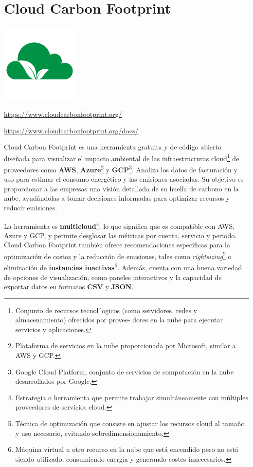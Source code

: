 \documentclass[12pt,a4paper]{report}
\begin{document}
\section*{Cloud Carbon Footprint}

\begin{center}
\includegraphics[width=0.3\textwidth]{imagenes/Cloud_Logo.png}
\end{center}

\href{https://www.cloudcarbonfootprint.org/}{https://www.cloudcarbonfootprint.org/}

\href{https://www.cloudcarbonfootprint.org/docs/}{https://www.cloudcarbonfootprint.org/docs/}

Cloud Carbon Footprint es una herramienta gratuita y de código abierto diseñada
para visualizar el impacto ambiental de las infraestructuras cloud\footnote{Conjunto de recursos tecnol´ogicos (como servidores, redes y almacenamiento) ofrecidos por provee-
  dores en la nube para ejecutar servicios y aplicaciones.} de
proveedores como \textbf{AWS}, \textbf{Azure}\footnote{Plataforma de
  servicios en la nube proporcionada por Microsoft, similar a AWS y GCP.} y
\textbf{GCP}\footnote{Google Cloud Platform, conjunto de servicios de
  computación en la nube desarrollados por Google.}. Analiza los datos de
facturación y uso para estimar el consumo energético y las emisiones asociadas.
Su objetivo es proporcionar a las empresas una visión detallada de su huella de
carbono en la nube, ayudándolas a tomar decisiones informadas para optimizar
recursos y reducir emisiones.

La herramienta es \textbf{multicloud}\footnote{Estrategia o herramienta que
  permite trabajar simultáneamente con múltiples proveedores de servicios
  cloud.}, lo que significa que es compatible con AWS, Azure y GCP, y permite
desglosar las métricas por cuenta, servicio y periodo. Cloud Carbon Footprint
también ofrece recomendaciones específicas para la optimización de costos y la
reducción de emisiones, tales como \textit{rightsizing}\footnote{Técnica de
  optimización que consiste en ajustar los recursos cloud al tamaño y uso
  necesario, evitando sobredimensionamiento.} o eliminación de \textbf{instancias
  inactivas}\footnote{Máquina virtual u otro recurso en la nube que está
  encendido pero no está siendo utilizado, consumiendo energía y generando costes
  innecesarios.}. Además, cuenta con una buena variedad de opciones de
visualización, como paneles interactivos y la capacidad de exportar datos en
formatos \textbf{CSV} y \textbf{JSON}.
\end{document}
